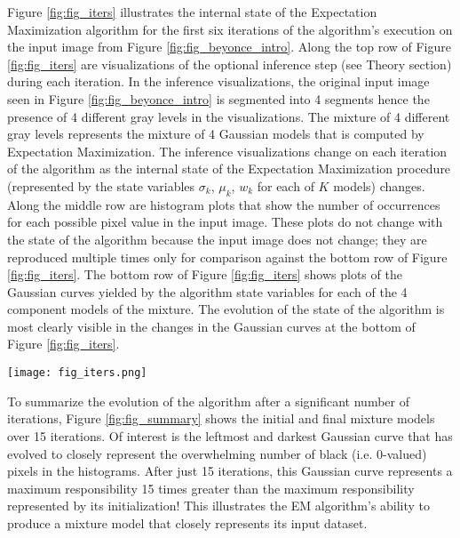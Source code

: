 \documentclass[conference]{IEEEtran}
\begin{document}
Figure \ref{fig:fig_iters} illustrates the internal state of the Expectation Maximization algorithm for the first six iterations of the algorithm's execution on the input image from Figure \ref{fig:fig_beyonce_intro}. Along the top row of Figure \ref{fig:fig_iters} are visualizations of the optional inference step (see Theory section) during each iteration. In the inference visualizations, the original input image seen in Figure \ref{fig:fig_beyonce_intro} is segmented into 4 segments hence the presence of 4 different gray levels in the visualizations. The mixture of 4 different gray levels represents the mixture of 4 Gaussian models that is computed by Expectation Maximization. The inference visualizations change on each iteration of the algorithm as the internal state of the Expectation Maximization procedure (represented by the state variables $\sigma_k$, $\mu_k$, $w_k$ for each of $K$ models) changes. Along the middle row are histogram plots that show the number of occurrences for each possible pixel value in the input image. These plots do not change with the state of the algorithm because the input image does not change; they are reproduced multiple times only for comparison against the bottom row of Figure \ref{fig:fig_iters}. The bottom row of Figure \ref{fig:fig_iters} shows plots of the Gaussian curves yielded by the algorithm state variables for each of the 4 component models of the mixture. The evolution of the state of the algorithm is most clearly visible in the changes in the Gaussian curves at the bottom of Figure \ref{fig:fig_iters}. 

\begin{figure*}[ht]
\centering
\texttt{[image: fig\_iters.png]}
\caption{Full algorithm state visualization of first 6 iterations of the numerically stable expectation maximization procedure.}
\vfill
\label{fig:fig_iters}
\end{figure*}

To summarize the evolution of the algorithm after a significant number of iterations, Figure \ref{fig:fig_summary} shows the initial and final mixture models over 15 iterations. Of interest is the leftmost and darkest Gaussian curve that has evolved to closely represent the overwhelming number of black (i.e. 0-valued) pixels in the histograms. After just 15 iterations, this Gaussian curve represents a maximum responsibility 15 times greater than the maximum responsibility represented by its initialization! This illustrates the EM algorithm's ability to produce a mixture model that closely represents its input dataset.
\end{document}
